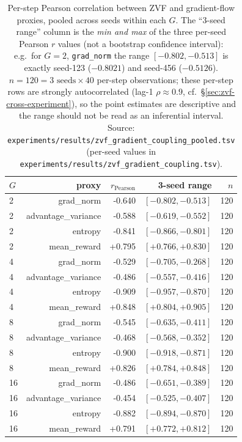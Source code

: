 \begin{table}[htbp]
\centering
\small
\begin{tabular}{lrrrr}
\toprule
$G$ & proxy & $r_{\text{Pearson}}$ & 3-seed range & $n$ \\
\midrule
2 & grad_norm & -0.640 & $[-0.802, -0.513]$ & 120 \\
2 & advantage_variance & -0.588 & $[-0.619, -0.552]$ & 120 \\
2 & entropy & -0.841 & $[-0.866, -0.801]$ & 120 \\
2 & mean_reward & +0.795 & $[+0.766, +0.830]$ & 120 \\
4 & grad_norm & -0.529 & $[-0.705, -0.268]$ & 120 \\
4 & advantage_variance & -0.486 & $[-0.557, -0.416]$ & 120 \\
4 & entropy & -0.909 & $[-0.957, -0.870]$ & 120 \\
4 & mean_reward & +0.848 & $[+0.804, +0.905]$ & 120 \\
8 & grad_norm & -0.545 & $[-0.635, -0.411]$ & 120 \\
8 & advantage_variance & -0.468 & $[-0.568, -0.352]$ & 120 \\
8 & entropy & -0.900 & $[-0.918, -0.871]$ & 120 \\
8 & mean_reward & +0.826 & $[+0.784, +0.848]$ & 120 \\
16 & grad_norm & -0.486 & $[-0.651, -0.389]$ & 120 \\
16 & advantage_variance & -0.454 & $[-0.525, -0.407]$ & 120 \\
16 & entropy & -0.882 & $[-0.894, -0.870]$ & 120 \\
16 & mean_reward & +0.791 & $[+0.772, +0.812]$ & 120 \\
\bottomrule
\end{tabular}
\caption{Per-step Pearson correlation between ZVF and gradient-flow
proxies, pooled across seeds within each $G$. The ``3-seed range''
column is the \emph{min and max} of the three per-seed Pearson $r$
values (not a bootstrap confidence interval): e.g.\ for $G{=}2$,
\texttt{grad\_norm} the range $[-0.802, -0.513]$ is exactly seed-123
($-0.8021$) and seed-456 ($-0.5126$). $n = 120 = 3\text{ seeds}
\times 40$ per-step observations; these per-step rows are strongly
autocorrelated (lag-1 $\rho \approx 0.9$, cf.\
\S\ref{sec:zvf-cross-experiment}), so the point estimates are
descriptive and the range should not be read as an inferential
interval. Source:
\texttt{experiments/results/zvf\_gradient\_coupling\_pooled.tsv}
(per-seed values in
\texttt{experiments/results/zvf\_gradient\_coupling.tsv}).}
\label{tab:zvf-gradient-coupling}
\end{table}
